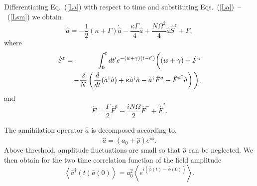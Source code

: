 \documentclass[aps,
twocolumn,
showpacs,
superscriptaddress,groupedaddress]{revtex4}
\begin{document}
Differentiating Eq.~(\ref{La}) with respect to time and substituting 
Eqs.~(\ref{La})~--~(\ref{Lsm}) we obtain
\begin{equation}
\ddot{\hat{a}} =
-\frac{1}{2} (\kappa+\Gamma)  \dot{\hat{a}} -
\frac{\kappa \Gamma}{4}\hat{a}  +
\frac{N \Omega^2 }{4} \hat{a} \hat{S}^z +\hat{F},
\label{addeq}
\end{equation}
where
\begin{eqnarray}
\hat{S}^z &=&
\int_0^t dt^{\prime} e^{-(w+\gamma)(t-t^{\prime})}
\bigg( (w+\gamma) + \hat{F}^z
\nonumber
\\
&&\hspace{-3mm}-\frac{2}{N} \left( \frac{d}{dt} (\hat{a}^{\dagger} \hat{a}) +
\kappa \hat{a}^{\dagger} \hat{a} -\hat{a}^{\dagger} \hat{F}^a -
\hat{F}^{a^{\dagger}} \hat{a} \right) \bigg),
\end{eqnarray}
and
\begin{equation}
\hat{F} = \frac{\Gamma}{2} \hat{F}^a-
\frac{i N \Omega}{2} \hat{F}^-+\dot{\hat{F}}^a.
\end{equation}

The annihilation operator $\hat{a}$ is decomposed according to,
\begin{equation}
\hat{a}= (a_0 + \hat{\rho}) e^{i\hat{\phi}}.
\label{adecomp}
\end{equation}
Above threshold, amplitude fluctuations are small so that $\hat\rho$
can be neglected.  We then obtain for the two time correlation function
of the field amplitude
\begin{equation}
\left< \hat{a}^{\dagger}(t) \hat{a}(0) \right> =
a_0^2 \left< e^{i(\hat{\phi}(t) - \hat{\phi}(0))} \right>.
\end{equation}
\end{document}
